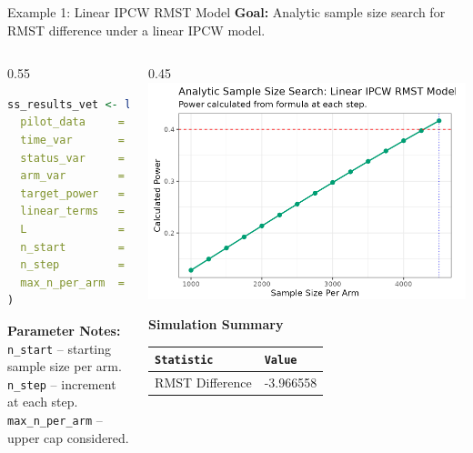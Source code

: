 \documentclass{beamer}
\begin{document}
\begin{frame}[fragile]{Example 1: Linear IPCW RMST Model}
\textbf{Goal:} Analytic sample size search for RMST difference under a linear IPCW model.

\begin{columns}[T,onlytextwidth]
  \begin{column}{0.55\textwidth}
  \scriptsize
\begin{lstlisting}[language=R]
ss_results_vet <- linear.ss.analytical(
  pilot_data     = vet,
  time_var       = "time",
  status_var     = "status",
  arm_var        = "arm",
  target_power   = 0.40,
  linear_terms   = "karno",
  L              = 365,
  n_start        = 1000,
  n_step         = 250,
  max_n_per_arm  = 5000
)
\end{lstlisting}
{\scriptsize
\textbf{Parameter Notes:} \\
\texttt{n\_start} – starting sample size per arm. \\
\texttt{n\_step} – increment at each step. \\
\texttt{max\_n\_per\_arm} – upper cap considered. \\
}
  \end{column}
  \begin{column}{0.45\textwidth}
    \centering
    \includegraphics[width=\linewidth]{images/Example_LIN.png}

    \vspace{0.4em}
    \footnotesize
   \textbf{Simulation Summary}

    \vspace{0.25em}
 \begin{tabular}{@{}ll@{}}
      \toprule
      \texttt{Statistic} & \texttt{Value} \\
      \midrule
       RMST Difference  & -3.966558 \\
      \bottomrule
    \end{tabular}
  \end{column}
\end{columns}


\end{frame}
\end{document}
